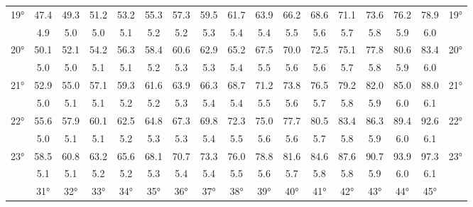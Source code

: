 \begin{footnotesize}
\begin{tabular}{c || c | c | c | c | c | c | c | c | c | c | c | c | c | c | c || c}
		\multirow{2}{*}{19°}&47.4&49.3&51.2&53.2&55.3&57.3&59.5&61.7&63.9&66.2&68.6&71.1&73.6&76.2&78.9&\multirow{2}{*}{19°}\\ \space&4.9&5.0&5.0&5.1&5.2&5.2&5.3&5.4&5.4&5.5&5.6&5.7&5.8&5.9&6.0&\space\\\hline
		\multirow{2}{*}{20°}&50.1&52.1&54.2&56.3&58.4&60.6&62.9&65.2&67.5&70.0&72.5&75.1&77.8&80.6&83.4&\multirow{2}{*}{20°}\\ \space&5.0&5.0&5.1&5.1&5.2&5.3&5.3&5.4&5.5&5.6&5.6&5.7&5.8&5.9&6.0&\space\\\hline
		\multirow{2}{*}{21°}&52.9&55.0&57.1&59.3&61.6&63.9&66.3&68.7&71.2&73.8&76.5&79.2&82.0&85.0&88.0&\multirow{2}{*}{21°}\\ \space&5.0&5.1&5.1&5.2&5.2&5.3&5.4&5.4&5.5&5.6&5.7&5.8&5.9&6.0&6.1&\space\\\hline
		\multirow{2}{*}{22°}&55.6&57.9&60.1&62.5&64.8&67.3&69.8&72.3&75.0&77.7&80.5&83.4&86.3&89.4&92.6&\multirow{2}{*}{22°}\\ \space&5.0&5.1&5.1&5.2&5.3&5.3&5.4&5.5&5.6&5.6&5.7&5.8&5.9&6.0&6.1&\space\\\hline
		\multirow{2}{*}{23°}&58.5&60.8&63.2&65.6&68.1&70.7&73.3&76.0&78.8&81.6&84.6&87.6&90.7&93.9&97.3&\multirow{2}{*}{23°}\\ \space&5.1&5.1&5.2&5.2&5.3&5.4&5.4&5.5&5.6&5.7&5.8&5.8&5.9&6.0&6.1&\space\\\hline
		\hline\space &31°&32°&33°&34°&35°&36°&37°&38°&39°&40°&41°&42°&43°&44°&45°
\end{tabular}\end{footnotesize}

